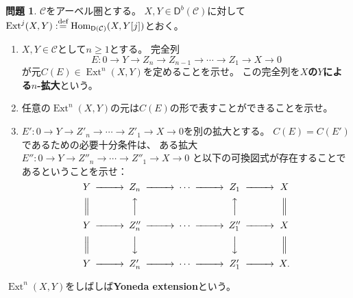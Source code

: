 \documentclass[uplatex,dvipdfmx]{jsarticle}
\theoremstyle{definition}
\newtheorem{prob}[prob]{問題}
\DeclareMathOperator{\Hom}{\mathrm{Hom}}
\DeclareMathOperator{\Ext}{\mathrm{Ext}}
\newcommand{\sfD}{\mathsf{D}}
\newcommand\mcC{\mathcal{C}}
\def\dfn{:\overset{\mbox{{\scriptsize def}}}{=}}
\begin{document}
\begin{prob}\label{1.39}
  \(\mcC\)をアーベル圏とする。
  \(X,Y\in \sfD^b(\mcC)\)に対して
  \(\Ext^j(X,Y) \dfn \Hom_{\sfD(\mcC)}(X,Y[j])\)とおく。
  \begin{enumerate}
    \item \label{1.39.1}
    \(X,Y\in \mcC\)として\(n\geq 1\)とする。
    完全列
    \[
    E: 0 \to Y\to Z_n\to Z_{n-1} \to \cdots \to Z_1 \to X\to 0
    \]
    が元\(C(E) \in \Ext^n(X,Y)\)を定めることを示せ。
    この完全列を\textbf{\(X\)の\(Y\)による\(n\)-拡大}という。
    \item \label{1.39.2}
    任意の\(\Ext^n(X,Y)\)の元は\(C(E)\)の形で表すことができることを示せ。
    \item \label{1.39.3}
    \(E':0\to Y\to Z'_n\to \cdots \to Z'_1\to X\to 0\)を別の拡大とする。
    \(C(E) = C(E')\)であるための必要十分条件は、
    ある拡大\(E'': 0\to Y\to Z''_n\to \cdots \to Z''_1\to X\to 0\)
    と以下の可換図式が存在することであるということを示せ：
    \[
    \begin{CD}
      Y @>>> Z_n @>>> \cdots @>>> Z_1 @>>> X \\
      @| @AAA @. @AAA @| \\
      Y @>>> Z''_n @>>> \cdots @>>> Z''_1 @>>> X \\
      @| @VVV @. @VVV @| \\
      Y @>>> Z'_n @>>> \cdots @>>> Z'_1 @>>> X.
    \end{CD}
    \]
  \end{enumerate}
  \(\Ext^n(X,Y)\)をしばしば\textbf{Yoneda extension}という。
\end{prob}
\end{document}
